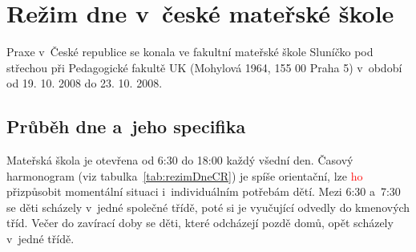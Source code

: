 

\section{Režim dne v~české mateřské škole}

		Praxe v~České republice se konala ve fakultní mateřské škole Sluníčko pod střechou při Pedagogické fakultě UK (Mohylová 1964, 155 00 Praha 5) v~období od 19. 10. 2008 do 23. 10. 2008. 

	\subsection{Průběh dne a~jeho specifika}

			Mateřská škola je otevřena od 6:30 do 18:00 každý všední den. Časový harmonogram (viz tabulka~\ref{tab:rezimDneCR})
			je spíše orientační, lze \textcolor{red}{ho} přizpůsobit momentální situaci i~individuálním potřebám dětí. Mezi 6:30 a~7:30 se děti scházely v~jedné společné třídě, poté si je vyučující odvedly do kmenových tříd. Večer do zavírací doby se děti, které odcházejí pozdě domů, opět scházely v~jedné třídě.

